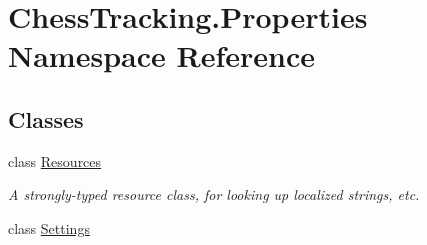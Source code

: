 \hypertarget{namespace_chess_tracking_1_1_properties}{}\section{Chess\+Tracking.\+Properties Namespace Reference}
\label{namespace_chess_tracking_1_1_properties}
\subsection*{Classes}
\begin{DoxyCompactItemize}
\item 
class \mbox{\hyperlink{class_chess_tracking_1_1_properties_1_1_resources}{Resources}}
\begin{DoxyCompactList}\small\item\em A strongly-\/typed resource class, for looking up localized strings, etc. \end{DoxyCompactList}\item 
class \mbox{\hyperlink{class_chess_tracking_1_1_properties_1_1_settings}{Settings}}
\end{DoxyCompactItemize}
